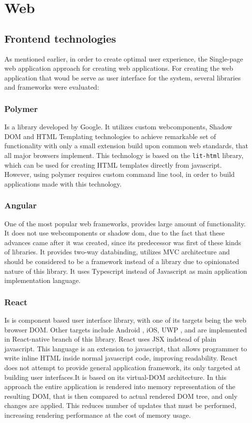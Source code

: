 \section{Web}
\subsection{Frontend technologies}
As mentioned earlier, in order to create optimal user experience, the Single-page web application approach for creating
web applications. For creating the web application that woud be serve as user interface for the system, several
libraries and frameworks were evaluated:

\subsubsection{Polymer}
Is a library developed by Google. It utilizes custom webcomponents, Shadow DOM  and HTML Templating technologies
to achieve remarkable set of functionality with only a small extension build upon common web standards, that all major
browsers implement. This technology is based on the \verb|lit-html| library, which can be used for creating HTML templates directly from
javascript. However, using polymer requires custom command line tool, in order to build applications made with this technology.

\subsubsection{Angular}
One of the most popular web frameworks, provides large amount of functionality. It does not use webcomponents or shadow dom,
due to the fact that these advances came after it was created, since its predecessor was first of these kinds of libraries.
It provides two-way databinding, utilizes MVC architecture and should be considered to be a framework instead of a library
due to opinionated nature of this library. It uses Typescript instead of Javascript as main application implementation language.

\subsubsection{React}
Is is component based user interface library, with one of its targets being the web browser DOM. Other targets
include Android , iOS, UWP , and are implemented in React-native branch of this library. React uses
JSX indstead of plain javascript. This language is an extension to javascript, that allows programmer to write inline
HTML inside normal javascript code, improving readability. React does not attempt to provide general application framework,
its only targeted at building user interfaces.It is based on its virtual-DOM architecture. In this approach
the entire application is rendered into memory representation of the resulting DOM, that is then compared to actual rendered
DOM tree, and only changes are applied. This reduces number of updates that must be performed, increasing rendering performance
at the cost of memory usage.

